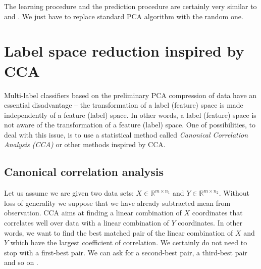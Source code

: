 \documentclass[english,a4paper,twoside]{ppfcmthesis}
\begin{document}
The learning procedure and the prediction procedure are certainly very similar to  and . We just have to replace standard PCA algorithm with the random one.

\section{Label space reduction inspired by CCA}

Multi-label classifiers based on the preliminary PCA compression of data have an essential disadvantage -- the transformation of a label (feature) space is made independently of a feature (label) space. In other words, a label (feature) space is not aware of the transformation of a feature (label) space. One of possibilities, to deal with this issue, is to use a statistical method called \textit{Canonical Correlation Analysis (\textit{CCA})} or other methods inspired by CCA.   

\subsection{Canonical correlation analysis}

Let us assume we are given two data sets: $X \in \mathbb{R}^{m \times n_1}$ and $Y \in \mathbb{R}^{m \times n_2}$. Without loss of generality we suppose that we have already subtracted mean from observation. CCA aims at finding a linear combination of $X$ coordinates that correlates well over data with a linear combination of $Y$ coordinates. In other words, we want to find the best matched pair of the linear combination of $X$ and $Y$ which have the largest coefficient of correlation. We certainly do not need to stop with a first-best pair. We can ask for a second-best pair, a third-best pair and so on \citep{William}.
\end{document}
